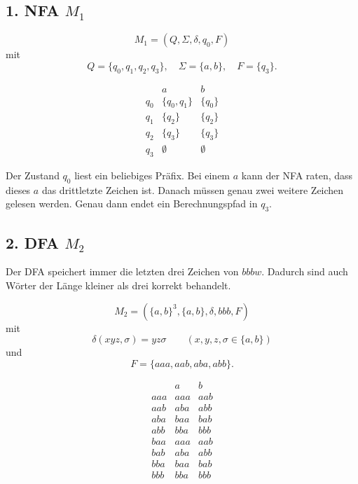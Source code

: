 \documentclass[a4paper,12pt]{article}
\begin{document}
\subsection*{1. NFA $M_1$}

\[
M_1=(Q,\Sigma,\delta,q_0,F)
\]
mit
\[
Q=\{q_0,q_1,q_2,q_3\},\quad \Sigma=\{a,b\},\quad F=\{q_3\}.
\]

\[
\begin{array}{c|cc}
 & a & b\\ \hline
q_0 & \{q_0,q_1\} & \{q_0\}\\
q_1 & \{q_2\} & \{q_2\}\\
q_2 & \{q_3\} & \{q_3\}\\
q_3 & \emptyset & \emptyset
\end{array}
\]

\begin{flushleft}
\end{flushleft}

Der Zustand $q_0$ liest ein beliebiges Präfix. Bei einem $a$ kann der NFA raten, dass dieses $a$ das drittletzte Zeichen ist. Danach müssen genau zwei weitere Zeichen gelesen werden. Genau dann endet ein Berechnungspfad in $q_3$.

\subsection*{2. DFA $M_2$}

Der DFA speichert immer die letzten drei Zeichen von $bbbw$. Dadurch sind auch Wörter der Länge kleiner als drei korrekt behandelt.

\[
M_2=(\{a,b\}^3,\{a,b\},\delta,bbb,F)
\]
mit
\[
\delta(xyz,\sigma)=yz\sigma
\qquad (x,y,z,\sigma\in\{a,b\})
\]
und
\[
F=\{aaa,aab,aba,abb\}.
\]

\[
\begin{array}{c|cc}
 & a & b\\ \hline
aaa & aaa & aab\\
aab & aba & abb\\
aba & baa & bab\\
abb & bba & bbb\\
baa & aaa & aab\\
bab & aba & abb\\
bba & baa & bab\\
bbb & bba & bbb
\end{array}
\]
\end{document}
